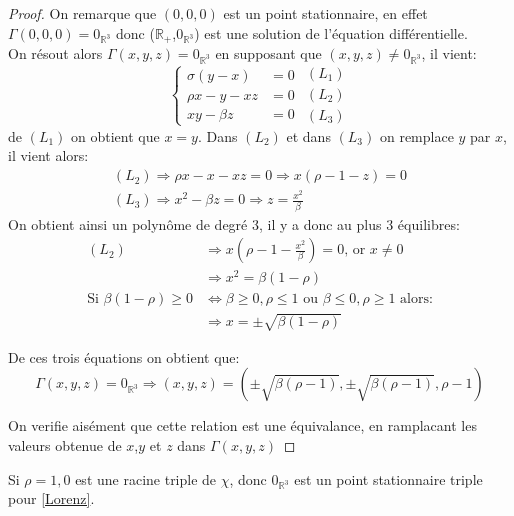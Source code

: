 \documentclass{article}
\newcommand{\R}{\mathbb{R}}
\newtheorem[M , nocut]{prop}{Proposition}[section]
\newtheorem[S , nocut]{definition}{Définition}
\newtheorem[S , nocut]{lemme}{Lemme}
\newtheorem[L , nocut]{thm}{Théoreme}
\newtheorem[L , nocut]{cor}{Corollaire}
\begin{document}
\begin{proof}
On remarque que $(0,0,0)$ est un point stationnaire, en effet $\Gamma(0,0,0) = 0_{\R^3}$ donc ($\R_+$,$0_{\R^3}$) est une solution de l'équation différentielle.\\
On résout alors $\Gamma(x,y,z)=0_{\R^3}$ en supposant que $(x,y,z) \neq 0_{\R^3}$, il vient:
\[
\left\{\begin{array}{rl} %
     \sigma(y-x)&=0  \\
     \rho x -y -xz&=0\\
     xy - \beta z&=0
\end{array}\right.
\begin{array}{c} %
    (L_1)\\
    (L_2)\\
    (L_3)
\end{array}
\]
de $(L_1)$ on obtient que $x=y$. Dans $(L_2)$ et dans $(L_3)$ on remplace $y$ par $x$, il vient alors:
\begin{gather*}
    (L_2) \Rightarrow \rho x - x - xz = 0 \Rightarrow x (\rho -1 -z ) = 0 \\
    (L_3) \Rightarrow x^2 - \beta z = 0 \Rightarrow z = \frac{x^2}{\beta}
\end{gather*}
On obtient ainsi un polynôme de degré 3, il y a donc au plus 3 équilibres:
\begin{align*}
    (L_2) & \Rightarrow x (\rho - 1 - \frac{x^2}{\beta}) = 0 \text{, or }x \neq 0\\
        & \Rightarrow x^2 = \beta (1-\rho)\\
    \text{Si } \beta(1-\rho) \ge 0 & \Leftrightarrow \beta \ge 0,\rho\le 1 \text{ ou } \beta \le 0,\rho\ge 1\text{ alors:}\\
    &\Rightarrow x = \pm \sqrt{\beta(1-\rho)}
\end{align*}

De ces trois équations on obtient que:
\[
    \Gamma(x,y,z)=0_{\R^3} \Rightarrow (x,y,z) = (\pm \sqrt{ \beta (\rho -1)} ,\pm \sqrt{\beta (\rho -1)}, \rho -1)
\]

On verifie aisément que cette relation est une \'equivalance, en ramplacant les valeurs obtenue de $x$,$y$ et $z$ dans $\Gamma(x,y,z)$
\end{proof}

\begin{example}[Remarque]
    Si $\rho=1, 0$ est une racine triple de $\chi$, donc $0_{\R^3}$ est un point stationnaire triple pour \eqref{Lorenz}.
\end{example}
\end{document}
